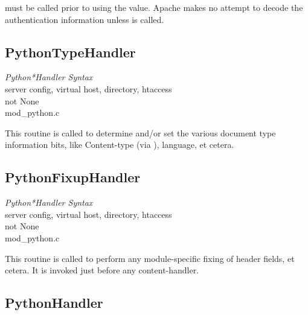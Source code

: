   must be called prior to using the
 value. Apache makes no attempt to decode the
authentication information unless  is called.

\subsection{PythonTypeHandler\label{dir-handlers-tph}}

\emph{Python*Handler Syntax}\\
server config, virtual host, directory, htaccess\\
not None\\
mod_python.c

This routine is called to determine and/or set the various document
type information bits, like Content-type (via ),
language, et cetera.

\subsection{PythonFixupHandler\label{dir-handlers-fuh}}

\emph{Python*Handler Syntax}\\
server config, virtual host, directory, htaccess\\
not None\\
mod_python.c

This routine is called to perform any module-specific fixing of header
fields, et cetera. It is invoked just before any content-handler.

\subsection{PythonHandler\label{dir-handlers-ph}}

